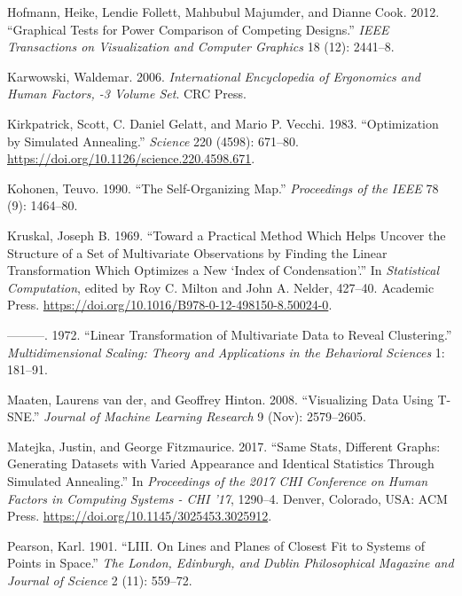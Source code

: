 \documentclass[11,]{article}
\begin{document}
\leavevmode\hypertarget{ref-hofmann_graphical_2012}{}%
Hofmann, Heike, Lendie Follett, Mahbubul Majumder, and Dianne Cook. 2012. ``Graphical Tests for Power Comparison of Competing Designs.'' \emph{IEEE Transactions on Visualization and Computer Graphics} 18 (12): 2441--8.

\leavevmode\hypertarget{ref-karwowski_international_2006}{}%
Karwowski, Waldemar. 2006. \emph{International Encyclopedia of Ergonomics and Human Factors, -3 Volume Set}. CRC Press.

\leavevmode\hypertarget{ref-kirkpatrick_optimization_1983}{}%
Kirkpatrick, Scott, C. Daniel Gelatt, and Mario P. Vecchi. 1983. ``Optimization by Simulated Annealing.'' \emph{Science} 220 (4598): 671--80. \url{https://doi.org/10.1126/science.220.4598.671}.

\leavevmode\hypertarget{ref-kohonen_self-organizing_1990}{}%
Kohonen, Teuvo. 1990. ``The Self-Organizing Map.'' \emph{Proceedings of the IEEE} 78 (9): 1464--80.

\leavevmode\hypertarget{ref-kruskal_toward_1969}{}%
Kruskal, Joseph B. 1969. ``Toward a Practical Method Which Helps Uncover the Structure of a Set of Multivariate Observations by Finding the Linear Transformation Which Optimizes a New `Index of Condensation'.'' In \emph{Statistical Computation}, edited by Roy C. Milton and John A. Nelder, 427--40. Academic Press. \url{https://doi.org/10.1016/B978-0-12-498150-8.50024-0}.

\leavevmode\hypertarget{ref-kruskal_linear_1972}{}%
---------. 1972. ``Linear Transformation of Multivariate Data to Reveal Clustering.'' \emph{Multidimensional Scaling: Theory and Applications in the Behavioral Sciences} 1: 181--91.

\leavevmode\hypertarget{ref-maaten_visualizing_2008}{}%
Maaten, Laurens van der, and Geoffrey Hinton. 2008. ``Visualizing Data Using T-SNE.'' \emph{Journal of Machine Learning Research} 9 (Nov): 2579--2605.

\leavevmode\hypertarget{ref-matejka_same_2017}{}%
Matejka, Justin, and George Fitzmaurice. 2017. ``Same Stats, Different Graphs: Generating Datasets with Varied Appearance and Identical Statistics Through Simulated Annealing.'' In \emph{Proceedings of the 2017 CHI Conference on Human Factors in Computing Systems - CHI '17}, 1290--4. Denver, Colorado, USA: ACM Press. \url{https://doi.org/10.1145/3025453.3025912}.

\leavevmode\hypertarget{ref-pearson_liii._1901}{}%
Pearson, Karl. 1901. ``LIII. On Lines and Planes of Closest Fit to Systems of Points in Space.'' \emph{The London, Edinburgh, and Dublin Philosophical Magazine and Journal of Science} 2 (11): 559--72.
\end{document}
